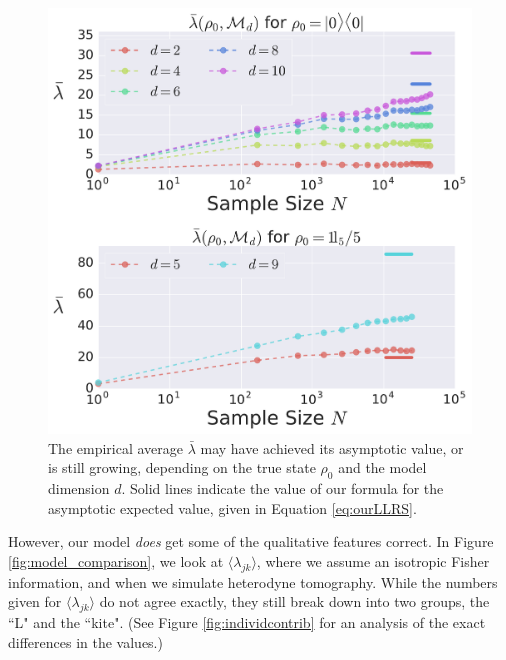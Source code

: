 \documentclass[aps,pra, twocolumn]{revtex4-1}
\begin{document}
\begin{figure}[h]
  \includegraphics[width=\columnwidth]{Images/Figure_9.pdf}
 \caption{The empirical average $\bar{\lambda}$  may have achieved its asymptotic value, or is still 
growing, depending on the true state $\rho_{0}$ and the model dimension $d$. Solid lines indicate the value of our formula
for the asymptotic expected value, given in Equation \eqref{eq:ourLLRS}.}
\label{fig:totalcontrib}
\end{figure}


However, our model \emph{does} get some of the qualitative features correct. In Figure \ref{fig:model_comparison}, we look at $\langle \lambda_{jk}\rangle$, where we assume an isotropic Fisher information, and when we simulate heterodyne tomography. While the numbers given for $\langle \lambda_{jk} \rangle$ do not agree exactly, they still break down into two groups, the ``L" and the ``kite". (See Figure \ref{fig:individcontrib} for an analysis of the exact differences in the values.)
 
\end{document}
